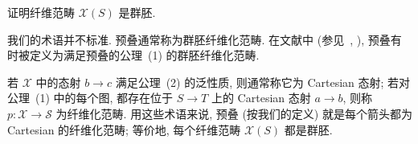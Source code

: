 \begin{exercise}\label{src:3.4.5}
证明纤维范畴 $\mathcal X(S)$ 是群胚.
\end{exercise}
\begin{caution}\label{src:3.4.6}
我们的术语并不标准. 预叠通常称为群胚纤维化范畴. 在文献中 (参见~\cite[§4]{FGI+05}, \cite[§4.6]{Ols16}), 预叠有时被定义为满足预叠的公理~(1) 的群胚纤维化范畴.

若 $\mathcal X$ 中的态射 $b\to c$ 满足公理~(2) 的泛性质, 则通常称它为 Cartesian 态射; 若对公理~(1) 中的每个图, 都存在位于 $S\to T$ 上的 Cartesian 态射 $a\to b$, 则称 $p:\mathcal X\to\mathcal S$ 为纤维化范畴.
用这些术语来说, 预叠 (按我们的定义) 就是每个箭头都为 Cartesian 的纤维化范畴; 等价地, 每个纤维范畴 $\mathcal X(S)$ 都是群胚.
\end{caution}

